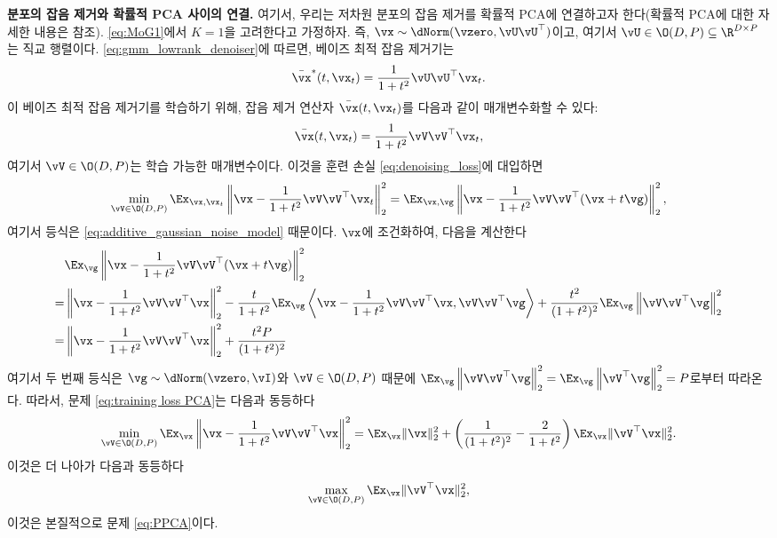 \documentclass[../../book-main_ko.tex]{subfiles}
\begin{document}
\begin{remark}
{\bf 분포의 잡음 제거와 확률적 PCA 사이의 연결.} 여기서, 우리는 저차원 분포의 잡음 제거를 확률적 PCA에 연결하고자 한다(확률적 PCA에 대한 자세한 내용은  참조). \eqref{eq:MoG1}에서 $K=1$을 고려한다고 가정하자. 즉, $\vx \sim   \dNorm(\vzero, \vU\vU^{\top})$이고, 여기서 \(\vU \in \O(D, P) \subseteq \R^{D \times P}\)는 직교 행렬이다. \eqref{eq:gmm_lowrank_denoiser}에 따르면, 베이즈 최적 잡음 제거기는
\begin{align}
    \bar{\vx}^{\ast}(t, \vx_{t}) = \frac{1}{1 + t^{2}} \vU\vU^\top\vx_t.
\end{align}
이 베이즈 최적 잡음 제거기를 학습하기 위해, 잡음 제거 연산자 $\bar{\vx}(t,\vx_t)$를 다음과 같이 매개변수화할 수 있다:
\begin{align}
    \bar{\vx}(t,\vx_t) = \frac{1}{1 + t^{2}} \vV\vV^\top\vx_t,
\end{align}
여기서 $\vV \in \O(D, P)$는 학습 가능한 매개변수이다. 이것을 훈련 손실 \eqref{eq:denoising_loss}에 대입하면
\begin{equation}\label{eq:training loss PCA}
	  \min_{\vV \in \O(D, P)}\Ex_{\vx, \vx_{t}}\left\|\vx - \frac{1}{1 + t^{2}} \vV\vV^\top\vx_t\right\|_{2}^{2} = \Ex_{\vx, \vg}\left\|\vx - \frac{1}{1 + t^{2}} \vV\vV^\top(\vx + t\vg)\right\|_{2}^{2},
\end{equation}
여기서 등식은 \eqref{eq:additive_gaussian_noise_model} 때문이다. $\vx$에 조건화하여, 다음을 계산한다
\begin{align}
    & \Ex_{\vg}\left\|\vx - \frac{1}{1 + t^{2}} \vV\vV^\top(\vx + t\vg)\right\|_{2}^{2} \\
    = & \left\|\vx - \frac{1}{1 + t^{2}} \vV\vV^\top \vx\right\|_{2}^{2} - \frac{t}{1+t^2}\Ex_{\vg} \left\langle \vx - \frac{1}{1 + t^{2}} \vV\vV^\top \vx,  \vV\vV^\top\vg \right\rangle + \frac{t^2}{(1+t^2)^2} \Ex_{\vg}\left\| \vV\vV^\top \vg \right\|_2^2 \\
    = & \left\|\vx - \frac{1}{1 + t^{2}} \vV\vV^\top \vx\right\|_{2}^{2} + \frac{t^2P}{(1+t^2)^2}
\end{align}
여기서 두 번째 등식은 \(\vg \sim \dNorm(\vzero, \vI)\)와 $\vV \in \O(D, P)$ 때문에 $ \Ex_{\vg}\left\| \vV\vV^\top \vg \right\|_2^2 = \Ex_{\vg}\left\|\vV^\top \vg \right\|_2^2 = P$로부터 따라온다. 따라서, 문제 \eqref{eq:training loss PCA}는 다음과 동등하다
\begin{align}
    \min_{\vV \in \O(D, P)}\Ex_{\vx} \left\|\vx - \frac{1}{1 + t^{2}} \vV\vV^\top \vx\right\|_{2}^{2} = \Ex_{\vx} \|\vx\|_2^2 + \left( \frac{1}{(1+t^2)^2} - \frac{2}{1+t^2} \right) \Ex_{\vx}\|\vV^\top \vx\|_2^2.
\end{align}
이것은 더 나아가 다음과 동등하다
\begin{align}
    \max_{\vV \in \O(D, P)} \Ex_{\vx}\|\vV^\top \vx\|_2^2,
\end{align}
이것은 본질적으로 문제 \eqref{eq:PPCA}이다.
\end{remark}
\end{document}
